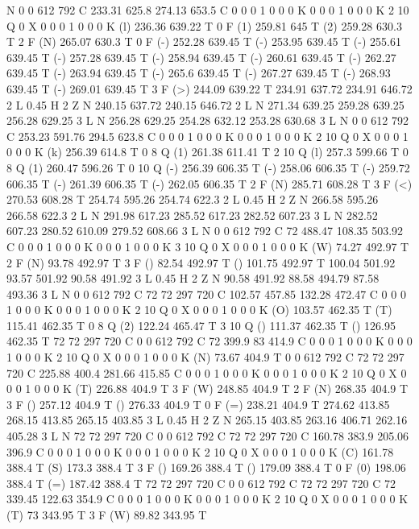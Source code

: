N
0 0 612 792 C
233.31 625.8 274.13 653.5 C
0 0 0 1 0 0 0 K
0 0 0 1 0 0 0 K
2 10 Q
0 X
0 0 0 1 0 0 0 K
(l) 236.36 639.22 T
0 F
(1) 259.81 645 T
(2) 259.28 630.3 T
2 F
(N) 265.07 630.3 T
0 F
(-) 252.28 639.45 T
(-) 253.95 639.45 T
(-) 255.61 639.45 T
(-) 257.28 639.45 T
(-) 258.94 639.45 T
(-) 260.61 639.45 T
(-) 262.27 639.45 T
(-) 263.94 639.45 T
(-) 265.6 639.45 T
(-) 267.27 639.45 T
(-) 268.93 639.45 T
(-) 269.01 639.45 T
3 F
(>) 244.09 639.22 T
234.91 637.72 234.91 646.72 2 L
0.45 H
2 Z
N
240.15 637.72 240.15 646.72 2 L
N
271.34 639.25 259.28 639.25 256.28 629.25 3 L
N
256.28 629.25 254.28 632.12 253.28 630.68 3 L
N
0 0 612 792 C
253.23 591.76 294.5 623.8 C
0 0 0 1 0 0 0 K
0 0 0 1 0 0 0 K
2 10 Q
0 X
0 0 0 1 0 0 0 K
(k) 256.39 614.8 T
0 8 Q
(1) 261.38 611.41 T
2 10 Q
(l) 257.3 599.66 T
0 8 Q
(1) 260.47 596.26 T
0 10 Q
(-) 256.39 606.35 T
(-) 258.06 606.35 T
(-) 259.72 606.35 T
(-) 261.39 606.35 T
(-) 262.05 606.35 T
2 F
(N) 285.71 608.28 T
3 F
(<) 270.53 608.28 T
254.74 595.26 254.74 622.3 2 L
0.45 H
2 Z
N
266.58 595.26 266.58 622.3 2 L
N
291.98 617.23 285.52 617.23 282.52 607.23 3 L
N
282.52 607.23 280.52 610.09 279.52 608.66 3 L
N
0 0 612 792 C
72 488.47 108.35 503.92 C
0 0 0 1 0 0 0 K
0 0 0 1 0 0 0 K
3 10 Q
0 X
0 0 0 1 0 0 0 K
(W) 74.27 492.97 T
2 F
(N) 93.78 492.97 T
3 F
() 82.54 492.97 T
() 101.75 492.97 T
100.04 501.92 93.57 501.92 90.58 491.92 3 L
0.45 H
2 Z
N
90.58 491.92 88.58 494.79 87.58 493.36 3 L
N
0 0 612 792 C
72 72 297 720 C
102.57 457.85 132.28 472.47 C
0 0 0 1 0 0 0 K
0 0 0 1 0 0 0 K
2 10 Q
0 X
0 0 0 1 0 0 0 K
(O) 103.57 462.35 T
(T) 115.41 462.35 T
0 8 Q
(2) 122.24 465.47 T
3 10 Q
() 111.37 462.35 T
() 126.95 462.35 T
72 72 297 720 C
0 0 612 792 C
72 399.9 83 414.9 C
0 0 0 1 0 0 0 K
0 0 0 1 0 0 0 K
2 10 Q
0 X
0 0 0 1 0 0 0 K
(N) 73.67 404.9 T
0 0 612 792 C
72 72 297 720 C
225.88 400.4 281.66 415.85 C
0 0 0 1 0 0 0 K
0 0 0 1 0 0 0 K
2 10 Q
0 X
0 0 0 1 0 0 0 K
(T) 226.88 404.9 T
3 F
(W) 248.85 404.9 T
2 F
(N) 268.35 404.9 T
3 F
() 257.12 404.9 T
() 276.33 404.9 T
0 F
(=) 238.21 404.9 T
274.62 413.85 268.15 413.85 265.15 403.85 3 L
0.45 H
2 Z
N
265.15 403.85 263.16 406.71 262.16 405.28 3 L
N
72 72 297 720 C
0 0 612 792 C
72 72 297 720 C
160.78 383.9 205.06 396.9 C
0 0 0 1 0 0 0 K
0 0 0 1 0 0 0 K
2 10 Q
0 X
0 0 0 1 0 0 0 K
(C) 161.78 388.4 T
(S) 173.3 388.4 T
3 F
() 169.26 388.4 T
() 179.09 388.4 T
0 F
(0) 198.06 388.4 T
(=) 187.42 388.4 T
72 72 297 720 C
0 0 612 792 C
72 72 297 720 C
72 339.45 122.63 354.9 C
0 0 0 1 0 0 0 K
0 0 0 1 0 0 0 K
2 10 Q
0 X
0 0 0 1 0 0 0 K
(T) 73 343.95 T
3 F
(W) 89.82 343.95 T
